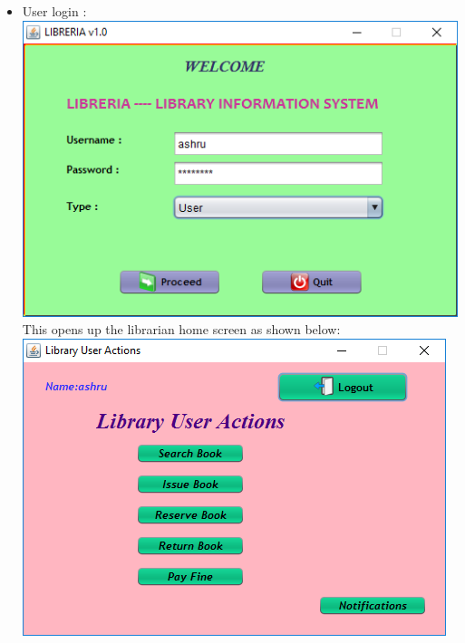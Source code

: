 \documentclass{article}
\begin{document}
\begin{enumerate}
\begin{itemize}
\item User login :\\
\includegraphics[scale=0.8]{images/UserLogin/LoginScreen.PNG}
\\This opens up the librarian home screen as shown below:\\
\includegraphics[scale=0.8]{images/UserLogin/UserActions.PNG}

\end{itemize}


\end{enumerate}
\end{document}
